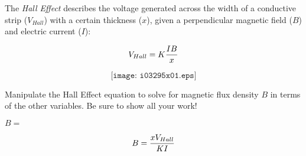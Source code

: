 

The {\it Hall Effect} describes the voltage generated across the width of a conductive strip ($V_{Hall}$) with a certain thickness ($x$), given a perpendicular magnetic field ($B$) and electric current ($I$):

$$V_{Hall} = K {IB \over x}$$

$$\texttt{[image: i03295x01.eps]}$$

\vskip 30pt

Manipulate the Hall Effect equation to solve for magnetic flux density $B$ in terms of the other variables.  Be sure to show all your work!

\vskip 50pt

$B = $








$$B = {x V_{Hall} \over KI}$$











